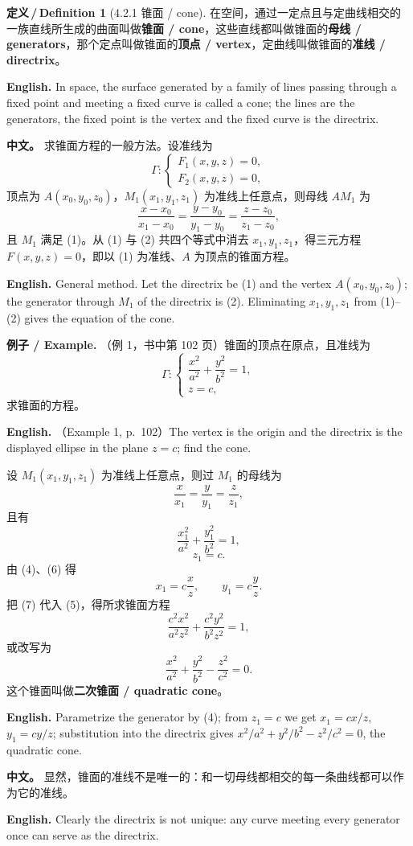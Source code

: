\documentclass[UTF8,11pt,a4paper]{ctexart}
\newcommand{\APS}[2]{\par\noindent\textbf{中文。} #1\par\noindent\textbf{English.} #2\par\smallskip}
\newcommand{\EN}[1]{\par\noindent \textbf{English.} #1\par}
\newcommand{\EX}[2]{\par\noindent \textbf{例子 / Example.} #1\par\EN{#2}}
\theoremstyle{definition}
\newtheorem*{definition}{定义\,/\,Definition}
\begin{document}
\begin{definition}[4.2.1 锥面 / cone]\label{def:cone}
在空间，通过一定点且与定曲线相交的一族直线所生成的曲面叫做\textbf{锥面 / cone}，这些直线都叫做锥面的\textbf{母线 / generators}，那个定点叫做锥面的\textbf{顶点 / vertex}，定曲线叫做锥面的\textbf{准线 / directrix}。
\EN{In space, the surface generated by a family of lines passing through a fixed point and meeting a fixed curve is called a cone; the lines are the generators, the fixed point is the vertex and the fixed curve is the directrix.}
\end{definition}

\APS{求锥面方程的一般方法。设准线为
\[
\Gamma:\begin{cases}F_1(x,y,z)=0,\\ F_2(x,y,z)=0,\end{cases}\tag{1}
\]
顶点为 $A(x_0,y_0,z_0)$，$M_1(x_1,y_1,z_1)$ 为准线上任意点，则母线 $AM_1$ 为
\[
\frac{x-x_0}{x_1-x_0}=\frac{y-y_0}{y_1-y_0}=\frac{z-z_0}{z_1-z_0},\tag{2}
\]
且 $M_1$ 满足 (1)。从 (1) 与 (2) 共四个等式中消去 $x_1,y_1,z_1$，得三元方程 $F(x,y,z)=0$，即以 (1) 为准线、$A$ 为顶点的锥面方程。}{General method. Let the directrix be (1) and the vertex $A(x_0,y_0,z_0)$; the generator through $M_1$ of the directrix is (2). Eliminating $x_1,y_1,z_1$ from (1)--(2) gives the equation of the cone.}

\EX{（例 1，书中第 102 页）锥面的顶点在原点，且准线为
\[
\Gamma:\begin{cases}\dfrac{x^2}{a^2}+\dfrac{y^2}{b^2}=1,\\ z=c,\end{cases}
\]
求锥面的方程。}{（Example 1, p.~102）The vertex is the origin and the directrix is the displayed ellipse in the plane $z=c$; find the cone.}
设 $M_1(x_1,y_1,z_1)$ 为准线上任意点，则过 $M_1$ 的母线为
\[
\frac{x}{x_1}=\frac{y}{y_1}=\frac{z}{z_1},\tag{4}
\]
且有
\[
\frac{x_1^2}{a^2}+\frac{y_1^2}{b^2}=1,\tag{5}
\]
\[
z_1=c.\tag{6}
\]
由 (4)、(6) 得
\[
x_1=c\frac{x}{z},\qquad y_1=c\frac{y}{z}.\tag{7}
\]
把 (7) 代入 (5)，得所求锥面方程
\[
\frac{c^2x^2}{a^2z^2}+\frac{c^2y^2}{b^2z^2}=1,
\]
或改写为
\[
\frac{x^2}{a^2}+\frac{y^2}{b^2}-\frac{z^2}{c^2}=0.\tag{4.2-1}
\]
这个锥面叫做\textbf{二次锥面 / quadratic cone}。
\EN{Parametrize the generator by (4); from $z_1=c$ we get $x_1=cx/z$, $y_1=cy/z$; substitution into the directrix gives $x^2/a^2+y^2/b^2-z^2/c^2=0$, the quadratic cone.}

\APS{显然，锥面的准线不是唯一的：和一切母线都相交的每一条曲线都可以作为它的准线。}{Clearly the directrix is not unique: any curve meeting every generator once can serve as the directrix.}
\end{document}
